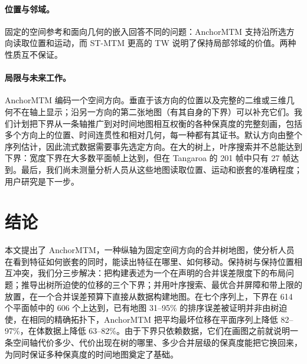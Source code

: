 \documentclass[preprint]{vgtc_zh}   %
\begin{document}
\paragraph{位置与邻域。} 固定的空间参考和面向几何的嵌入回答不同的问题：AnchorMTM 支持沿所选方向读取位置和运动，而 ST-MTM 更高的 TW 说明了保持局部邻域的价值。两种性质互不保证。

\paragraph{局限与未来工作。} AnchorMTM 编码一个空间方向。垂直于该方向的位置以及完整的二维或三维几何不在轴上显示；沿另一方向的第二张地图（有其自身的下界）可以补充它们。我们计划把下界从一条轴推广到对时间地图相互权衡的各种保真度的完整刻画，包括多个方向上的位置、时间连贯性和相对几何，每一种都有其证书。默认方向由整个序列估计，因此流式数据需要事先选定方向。在大的树上，叶序搜索并不总能达到下界：宽度下界在大多数平面帧上达到，但在 Tangaroa 的 201 帧中只有 27 帧达到。最后，我们尚未测量分析人员从这些地图读取位置、运动和嵌套的准确程度；用户研究是下一步。

\section{结论}
本文提出了 AnchorMTM，一种纵轴为固定空间方向的合并树地图，使分析人员在看到特征如何嵌套的同时，能读出特征在哪里、如何移动。保持树与保持位置相互冲突，我们分三步解决：把构建表述为一个在声明的合并误差限度下的布局问题；推导出树所迫使的位移的三个下界；并用叶序搜索、最优合并屏障和带上限的放置，在一个合并误差预算下直接从数据构建地图。在七个序列上，下界在 614 个平面帧中的 606 个上达到，已有地图 31--95\% 的排序误差被证明并非由树迫使，在相同的精确拓扑下，AnchorMTM 把平均最坏位移在平面序列上降低 82--97\%，在体数据上降低 63--82\%。由于下界只依赖数据，它们在画图之前就说明一条空间轴代价多少、代价出现在树的哪里、多少合并层级的保真度能把它换回来，为同时保证多种保真度的时间地图奠定了基础。
\FloatBarrier
\begingroup
{}


\endgroup
\end{document}
